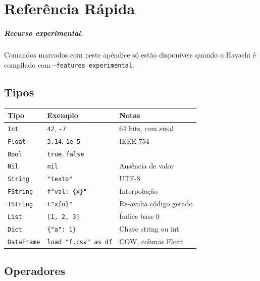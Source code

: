 \chapter{Referência Rápida}
\label{apendice:referencia}

\paragraph*{Recurso experimental.} Comandos marcados com \textdagger{} neste
apêndice só estão disponíveis quando o Hayashi é compilado com
\texttt{--features experimental}.


\section{Tipos}

\begin{center}
\begin{tabular}{lll}
\toprule
\textbf{Tipo} & \textbf{Exemplo} & \textbf{Notas} \\
\midrule
\texttt{Int}       & \texttt{42}, \texttt{-7}      & 64 bits, com sinal \\
\texttt{Float}     & \texttt{3.14}, \texttt{1e-5}  & IEEE 754 \\
\texttt{Bool}      & \texttt{true}, \texttt{false} & \\
\texttt{Nil}       & \texttt{nil}                  & Ausência de valor \\
\texttt{String}    & \texttt{"texto"}              & UTF-8 \\
\texttt{FString}   & \texttt{f"val: \{x\}"}        & Interpolação \\
\texttt{TString}   & \texttt{t"x\{n\}"}             & Re-avalia código gerado \\
\texttt{List}      & \texttt{[1, 2, 3]}            & Índice base 0 \\
\texttt{Dict}      & \texttt{\{"a": 1\}}           & Chave string ou int \\
\texttt{DataFrame} & \texttt{load "f.csv" as df}   & COW, colunas Float \\
\bottomrule
\end{tabular}
\end{center}

\section{Operadores}

